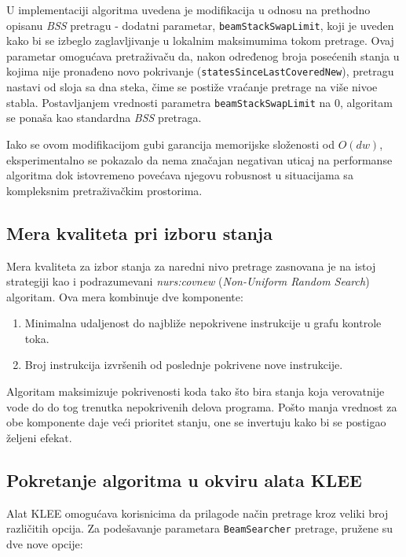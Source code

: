 \documentclass[a4paper]{article}
\begin{document}
U implementaciji algoritma uvedena je modifikacija u odnosu na prethodno opisanu \textit{BSS} pretragu - dodatni parametar, \verb|beamStackSwapLimit|, koji je uveden kako bi se izbeglo zaglavljivanje u lokalnim maksimumima tokom pretrage. Ovaj parametar omogućava pretraživaču da, nakon određenog broja posećenih stanja u kojima nije pronađeno novo pokrivanje (\verb|statesSinceLastCoveredNew|), pretragu nastavi od sloja sa dna steka, čime se postiže vraćanje pretrage na više nivoe stabla. Postavljanjem vrednosti parametra \verb|beamStackSwapLimit| na 0, algoritam se ponaša kao standardna \textit{BSS} pretraga.

Iako se ovom modifikacijom gubi garancija memorijske složenosti od $O(dw)$, eksperimentalno se pokazalo da nema značajan negativan uticaj na performanse algoritma dok istovremeno povećava njegovu robusnost u situacijama sa kompleksnim pretraživačkim prostorima.

\subsection{Mera kvaliteta pri izboru stanja}

Mera kvaliteta za izbor stanja za naredni nivo pretrage zasnovana je na istoj strategiji kao i podrazumevani \emph{nurs:covnew} (\emph{Non-Uniform Random Search}) algoritam. Ova mera kombinuje dve komponente:

\begin{enumerate}
\item Minimalna udaljenost do najbliže nepokrivene instrukcije u grafu kontrole toka.
\item Broj instrukcija izvršenih od poslednje pokrivene nove instrukcije.
\end{enumerate}

Algoritam maksimizuje pokrivenosti koda tako što bira stanja koja verovatnije vode do do tog trenutka nepokrivenih delova programa. Pošto manja vrednost za obe komponente daje veći prioritet stanju, one se invertuju kako bi se postigao željeni efekat.

\subsection{Pokretanje algoritma u okviru alata KLEE}

Alat KLEE omogućava korisnicima da prilagode način pretrage kroz veliki broj različitih opcija. Za podešavanje parametara \verb|BeamSearcher| pretrage, pružene su dve nove opcije:
\end{document}
